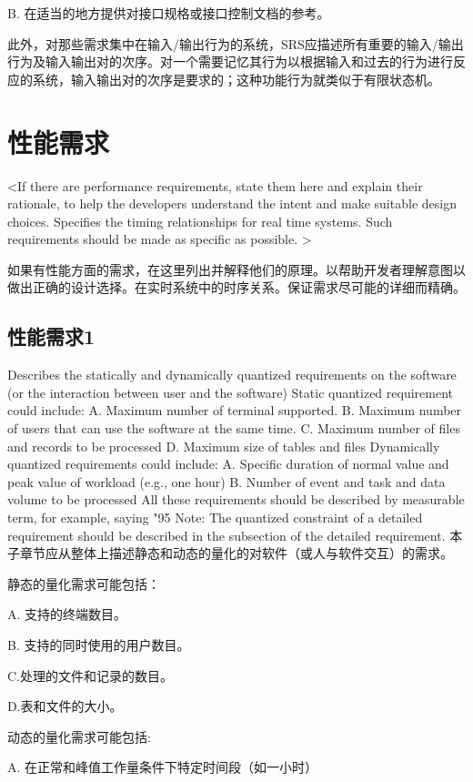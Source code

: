 B. 在适当的地方提供对接口规格或接口控制文档的参考。

此外，对那些需求集中在输入/输出行为的系统，SRS应描述所有重要的输入/输出行为及输入输出对的次序。对一个需要记忆其行为以根据输入和过去的行为进行反应的系统，输入输出对的次序是要求的；这种功能行为就类似于有限状态机。
\section{性能需求}
<If there are performance requirements, state them here and explain their rationale, to help the developers understand the intent and make suitable design choices. Specifies the timing relationships for real time systems. Such requirements should be made as specific as possible. >

如果有性能方面的需求，在这里列出并解释他们的原理。以帮助开发者理解意图以做出正确的设计选择。在实时系统中的时序关系。保证需求尽可能的详细而精确。
\subsection{性能需求1}
Describes the statically and dynamically quantized requirements on the software (or the interaction between user and the software)
Static quantized requirement could include:
A. Maximum number of terminal supported.
B. Maximum number of users that can use the software at the same time.
C. Maximum number of files and records to be processed
D. Maximum size of  tables and files
Dynamically quantized requirements could include:
A. Specific duration of normal value and peak value of workload (e.g., one hour)
B. Number of event and task and data volume to be processed 
All these requirements should be described by measurable term, for example, saying "95%
Note: The quantized constraint of a detailed requirement should be described in the subsection of the detailed requirement.
本子章节应从整体上描述静态和动态的量化的对软件（或人与软件交互）的需求。

静态的量化需求可能包括：

A. 支持的终端数目。

B. 支持的同时使用的用户数目。

C.处理的文件和记录的数目。

D.表和文件的大小。

动态的量化需求可能包括:

A. 在正常和峰值工作量条件下特定时间段（如一小时）

